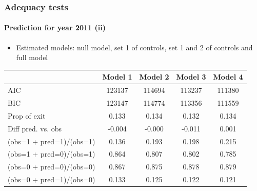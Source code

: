 \documentclass[xcolor=table,ignorenonframetext,12pt]{beamer}
\newenvironment{choixmarges}[2]{\begin{list}{}{%
\setlength{\topsep}{0pt}%
\setlength{\leftmargin}{0pt}%
\setlength{\rightmargin}{0pt}%
\setlength{\listparindent}{\parindent}%
\setlength{\itemindent}{\parindent}%
\setlength{\parsep}{0pt plus 1pt}%
\addtolength{\leftmargin}{#1}%
\addtolength{\rightmargin}{#2}%
}\item }{\end{list}}
\begin{document}
\begin{frame}
\frametitle{Adequacy tests}
\framesubtitle{Prediction for year 2011 (ii)}
\begin{choixmarges}{-0.5cm}{-0.5cm}

\begin{itemize}
\item Estimated models: null model, set 1 of controls, set 1 and 2 of controls and full model
\end{itemize}

\vspace{0.2cm}

\begin{table}[ht]
\centering
\begingroup\footnotesize
\begin{tabular}{lcccc}
  & Model 1 & Model 2 & Model 3 & Model 4 \\ 
  \hline
AIC & 123137 & 114694 & 113237 & 111380 \\ 
  BIC & 123147 & 114774 & 113356 & 111559 \\ 
   \hline
Prop of exit & 0.133 & 0.134 & 0.132 & 0.134 \\ 
  Diff pred. vs. obs & -0.004 & -0.000 & -0.011 & 0.001 \\ 
   \hline
(obs=1 + pred=1)/(obs=1) & 0.136 & 0.193 & 0.198 & 0.215 \\ 
  (obs=1 + pred=0)/(obs=1) & 0.864 & 0.807 & 0.802 & 0.785 \\ 
  (obs=0 + pred=0)/(obs=0) & 0.867 & 0.875 & 0.878 & 0.879 \\ 
  (obs=0 + pred=1)/(obs=0) & 0.133 & 0.125 & 0.122 & 0.121 \\ 
  \end{tabular}
\endgroup
\end{table}


\end{choixmarges}

\end{frame}
\end{document}
